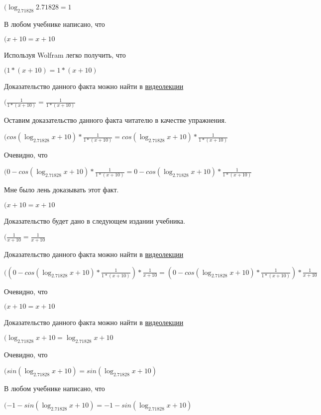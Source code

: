 \documentclass[12pt,a4paper,fleqn]{article}
\theoremstyle{definition}
\begin{document}
$(\log_{ 2.71828 }{ 2.71828 } =  1 $

В любом учебнике написано, что

$( x  +  10  =  x  +  10 $

Используя Wolfram легко получить, что

$( 1  * ( x  +  10 ) =  1  * ( x  +  10 )$

Доказательство данного факта можно найти в \href{https://www.youtube.com/watch?v=dQw4w9WgXcQ}{видеолекции}

$(\frac{ 1 }{ 1  * ( x  +  10 )}
 = \frac{ 1 }{ 1  * ( x  +  10 )}
$

Оставим доказательство данного факта читателю в качестве упражнения.

$(cos(\log_{ 2.71828 }{ x  +  10 }) * \frac{ 1 }{ 1  * ( x  +  10 )}
 = cos(\log_{ 2.71828 }{ x  +  10 }) * \frac{ 1 }{ 1  * ( x  +  10 )}
$

Очевидно, что

$( 0  - cos(\log_{ 2.71828 }{ x  +  10 }) * \frac{ 1 }{ 1  * ( x  +  10 )}
 =  0  - cos(\log_{ 2.71828 }{ x  +  10 }) * \frac{ 1 }{ 1  * ( x  +  10 )}
$

Мне было лень доказывать этот факт.

$( x  +  10  =  x  +  10 $

Доказательство будет дано в следующем издании учебника.

$(\frac{ 1 }{ x  +  10 }
 = \frac{ 1 }{ x  +  10 }
$

Доказательство данного факта можно найти в \href{https://www.youtube.com/watch?v=dQw4w9WgXcQ}{видеолекции}

$(( 0  - cos(\log_{ 2.71828 }{ x  +  10 }) * \frac{ 1 }{ 1  * ( x  +  10 )}
) * \frac{ 1 }{ x  +  10 }
 = ( 0  - cos(\log_{ 2.71828 }{ x  +  10 }) * \frac{ 1 }{ 1  * ( x  +  10 )}
) * \frac{ 1 }{ x  +  10 }
$

Очевидно, что

$( x  +  10  =  x  +  10 $

Доказательство данного факта можно найти в \href{https://www.youtube.com/watch?v=dQw4w9WgXcQ}{видеолекции}

$(\log_{ 2.71828 }{ x  +  10 } = \log_{ 2.71828 }{ x  +  10 }$

Очевидно, что

$(sin(\log_{ 2.71828 }{ x  +  10 }) = sin(\log_{ 2.71828 }{ x  +  10 })$

В любом учебнике написано, что

$( -1  - sin(\log_{ 2.71828 }{ x  +  10 }) =  -1  - sin(\log_{ 2.71828 }{ x  +  10 })$
\end{document}
